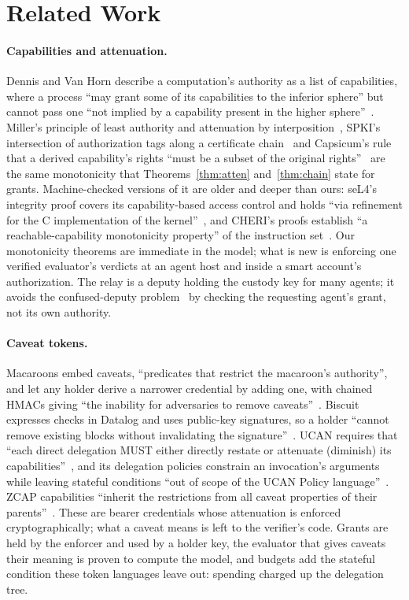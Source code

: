 \section{Related Work}\label{sec:related}

\paragraph{Capabilities and attenuation.} Dennis and Van Horn describe a
computation's authority as a list of capabilities, where a process ``may grant
some of its capabilities to the inferior sphere'' but cannot pass one ``not
implied by a capability present in the higher sphere''~\cite{dennis}. Miller's
principle of least authority and attenuation by interposition~\cite{miller},
SPKI's intersection of authorization tags along a certificate
chain~\cite{spki} and Capsicum's rule that a derived capability's rights
``must be a subset of the original rights''~\cite{capsicum} are the same
monotonicity that Theorems~\ref{thm:atten} and~\ref{thm:chain} state for
grants. Machine-checked versions of it are older and deeper than ours: seL4's
integrity proof covers its capability-based access control and holds ``via
refinement for the C implementation of the kernel''~\cite{sel4Integrity}, and
CHERI's proofs establish ``a reachable-capability monotonicity property'' of
the instruction set~\cite{cheriProofs}. Our monotonicity theorems are
immediate in the model; what is new is enforcing one verified evaluator's
verdicts at an agent host and inside a smart account's authorization. The
relay is a deputy holding the custody key for many agents; it avoids the
confused-deputy problem~\cite{confusedDeputy} by checking the requesting
agent's grant, not its own authority.

\paragraph{Caveat tokens.} Macaroons embed caveats, ``predicates that restrict
the macaroon's authority'', and let any holder derive a narrower credential by
adding one, with chained HMACs giving ``the inability for adversaries to remove
caveats''~\cite{macaroons}. Biscuit expresses checks in Datalog and uses
public-key signatures, so a holder ``cannot remove existing blocks without
invalidating the signature''~\cite{biscuit}. UCAN requires that ``each direct
delegation MUST either directly restate or attenuate (diminish) its
capabilities''~\cite{ucan}, and its delegation policies constrain an
invocation's arguments while leaving stateful conditions ``out of scope of the
UCAN Policy language''~\cite{ucanDelegation}. ZCAP capabilities ``inherit the
restrictions from all caveat properties of their parents''~\cite{zcapld}.
These are bearer credentials whose attenuation is enforced cryptographically;
what a caveat means is left to the verifier's code. Grants are held by the
enforcer and used by a holder key, the evaluator that gives caveats their
meaning is proven to compute the model, and budgets add the stateful
condition these token languages leave out: spending charged up the delegation
tree.


